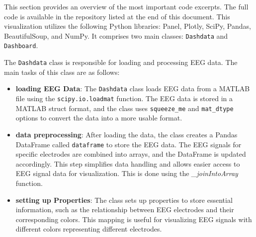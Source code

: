 \documentclass[format=sigconf]{acmart}
\begin{document}
			\par This section provides an overview of the most important code excerpts. The full code is available in the repository listed at the end of this document. This visualization utilizes the following Python libraries: Panel, Plotly, SciPy, Pandas, BeautifulSoup, and NumPy. It comprises two main classes: \texttt{Dashdata} and \texttt{Dashboard}.\newline
			
			\par The \texttt{Dashdata} class is responsible for loading and processing EEG data. The main tasks of this class are as follows:
			
			\begin{itemize}
				
				\item{\textbf{loading EEG Data}}: The \texttt{Dashdata} class loads EEG data from a MATLAB file using the \texttt{scipy.io.loadmat} function. The EEG data is stored in a MATLAB struct format, and the class uses \texttt{squeeze\_me} and \texttt{mat\_dtype} options to convert the data into a more usable format.
	
				
			
				\item{\textbf{data preprocessing}}: After loading the data, the class creates a Pandas DataFrame called \texttt{dataframe} to store the EEG data. The EEG signals for specific electrodes are combined into arrays, and the DataFrame is updated accordingly. This step simplifies data handling and allows easier access to EEG signal data for visualization. This is done using the \textit{\_joinIntoArray} function.
				
				
				
				
				
				\item{\textbf{setting up Properties}}: The class sets up properties to store essential information, such as the relationship between EEG electrodes and their corresponding colors. This mapping is useful for visualizing EEG signals with different colors representing different electrodes.
				
				
				

\end{itemize}
\end{document}
